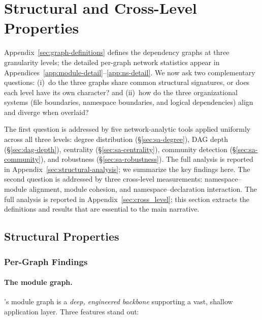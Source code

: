 \section{Structural and Cross-Level Properties}
\label{sec:structural-overview}
Appendix~\ref{sec:graph-definitions} defines the dependency graphs at three granularity levels; the detailed per-graph network statistics appear in Appendices~\ref{app:module-detail}--\ref{app:ns-detail}. We now ask two complementary questions: (i)~do the three graphs share common structural signatures, or does each level have its own character? and (ii)~how do the three organizational systems (file boundaries, namespace boundaries, and logical dependencies) align and diverge when overlaid?

The first question is addressed by five network-analytic tools applied uniformly across all three levels: degree distribution (\S\ref{sec:sa-degree}), DAG depth (\S\ref{sec:dag-depth}), centrality (\S\ref{sec:sa-centrality}), community detection (\S\ref{sec:sa-community}), and robustness (\S\ref{sec:sa-robustness}). The full analysis is reported in Appendix~\ref{sec:structural-analysis}; we summarize the key findings here. The second question is addressed by three cross-level measurements: namespace--module alignment, module cohesion, and namespace--declaration interaction. The full analysis is reported in Appendix~\ref{sec:cross_level}; this section extracts the definitions and results that are essential to the main narrative.

\subsection{Structural Properties}
\label{sec:structural-summary}
\label{sec:graph-analysis}

\subsubsection{Per-Graph Findings}

\paragraph{The module graph.}
\label{sec:module_conclusion}
's module graph is a \textit{deep, engineered backbone} supporting a vast, shallow application layer. Three features stand out:

